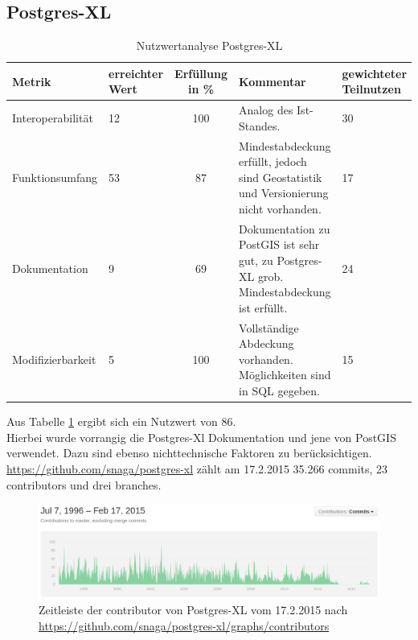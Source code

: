 \subsection{Postgres-XL}
\label{gegenuerbestellung:postgresxl}
\begin{table}[h!]
\centering
\small
\begin{tabular}{l|p{1.8cm}|c|p{3.1cm}|p{1.8cm}}
\textbf{Metrik} & \textbf{erreichter Wert} & \textbf{Erfüllung in \%} & \textbf{Kommentar} & \textbf{gewichteter Teilnutzen} \\ \hline
Interoperabilität & 12 & 100 & Analog des Ist-Standes. & 30 \\ \hline
Funktionsumfang & 53 & 87 & Mindestabdeckung erfüllt, jedoch sind Geostatistik und Versionierung nicht vorhanden. & 17 \\ \hline
Dokumentation & 9 & 69 & Dokumentation zu PostGIS ist sehr gut, zu Postgres-XL grob. Mindestabdeckung ist erfüllt. & 24 \\ \hline
Modifizierbarkeit & 5 & 100 & Vollständige Abdeckung vorhanden. Möglichkeiten sind in SQL gegeben. & 15 \\
\end{tabular}
\caption{Nutzwertanalyse Postgres-XL}
\label{table:nutzwertanalyse-postgresxl}
\end{table}
Aus Tabelle \ref{table:nutzwertanalyse-postgresxl} ergibt sich ein Nutzwert von 86.\\
Hierbei wurde vorrangig die Postgres-Xl Dokumentation \cite{website:postgresxl-manual} und jene von PostGIS \cite{website:postgisdocu-functions} verwendet.
Dazu sind ebenso nichttechnische Faktoren zu berücksichtigen.\\
\url{https://github.com/snaga/postgres-xl} zählt am 17.2.2015 35.266 commits, 23 contributors und drei branches.
\begin{figure}[h!]
\centering
\includegraphics[width=\textwidth]{Abbildungen/postgresxl_timeline_contributors.png}
\caption[Zeitleiste der contributor von Postgres-XL]{Zeitleiste der contributor von Postgres-XL vom 17.2.2015 nach \url{https://github.com/snaga/postgres-xl/graphs/contributors}}
\label{fig:timeline_contr_postgresxl}
\end{figure}
